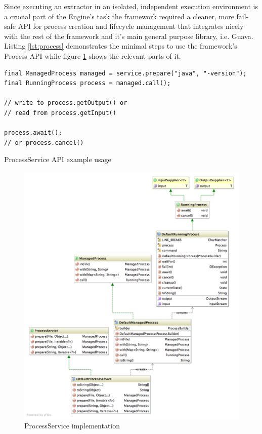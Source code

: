Since executing an extractor in an isolated, independent execution environment is a crucial part of the Engine's task the framework required a cleaner, more fail-safe API for process creation and lifecycle management that integrates nicely with the rest of the framework and it's main general purpose library, i.e. Guava. Listing \ref{lst:process} demonstrates the minimal steps to use the  framework's Process API while figure \ref{fig:process} shows the relevant parts of it.

\begin{listing}[H]
\begin{verbatim}
final ManagedProcess managed = service.prepare("java", "-version");
final RunningProcess process = managed.call();

// write to process.getOutput() or
// read from process.getInput()

process.await();
// or process.cancel()
\end{verbatim}
\caption{ProcessService API example usage}
\label{lst:process}
\end{listing}

\begin{figure}[H]
\centering
\includegraphics[width=\textwidth]{process.png}
\caption{ProcessService implementation}
\label{fig:process}
\end{figure}

